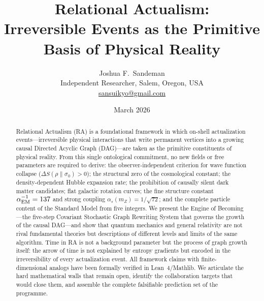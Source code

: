 \documentclass[11pt,twocolumn]{article}
\theoremstyle{plain}
\theoremstyle{remark}
\begin{document}
\title{Relational Actualism:\\
Irreversible Events as the Primitive Basis of Physical Reality}

\author{Joshua F.~Sandeman\\
\small Independent Researcher, Salem, Oregon, USA\\
\small \href{mailto:sansuikyo@gmail.com}{sansuikyo@gmail.com}}

\date{March 2026}

\begin{abstract}
Relational Actualism (RA) is a foundational framework in which
on-shell actualization events---irreversible physical interactions
that write permanent vertices into a growing causal Directed
Acyclic Graph (DAG)---are taken as the primitive constituents
of physical reality.
From this single ontological commitment, no new fields or free
parameters are required to derive: the observer-independent
criterion for wave function collapse ($\Delta S(\rho\|\sigma_0)>0$);
the structural zero of the cosmological constant; the density-dependent
Hubble expansion rate; the prohibition of causally silent dark matter
candidates; flat galactic rotation curves; the fine structure constant
$\alpha_{\rm EM}^{-1}=137$ and strong coupling $\alpha_s(m_Z)=
1/\sqrt{72}$; and the complete particle content of the Standard Model
from five integers.
We present the Engine of Becoming---the five-step Covariant Stochastic
Graph Rewriting System that governs the growth of the causal DAG---and
show that quantum mechanics and general relativity are not rival
fundamental theories but descriptions of different levels and limits
of the same algorithm.
Time in RA is not a background parameter but the process of graph growth
itself: the arrow of time is not explained by entropy gradients but
encoded in the irreversibility of every actualization event.
All framework claims with finite-dimensional analogs have been formally
verified in Lean~4/Mathlib.
We articulate the hard mathematical walls that remain open,
identify the collaboration targets that would close them, and assemble
the complete falsifiable prediction set of the programme.
\end{abstract}

\maketitle

\end{document}
